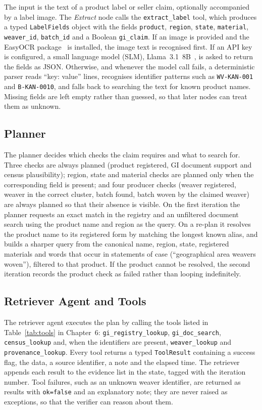 The input is the text of a product label or seller claim, optionally accompanied by a label image. The
\emph{Extract} node calls the \texttt{extract\_label} tool, which produces a typed \texttt{LabelFields}
object with the fields \texttt{product}, \texttt{region}, \texttt{state}, \texttt{material},
\texttt{weaver\_id}, \texttt{batch\_id} and a Boolean \texttt{gi\_claim}. If an image is provided and the
EasyOCR package~\cite{easyocr} is installed, the image text is recognised first. If an API key is
configured, a small language model (SLM), Llama~3.1~8B~\cite{llama3}, is asked to return the fields as
JSON. Otherwise, and whenever the model call fails, a deterministic parser reads ``key: value'' lines,
recognises identifier patterns such as \texttt{WV-KAN-001} and \texttt{B-KAN-0010}, and falls back to
searching the text for known product names. Missing fields are left empty rather than guessed, so that
later nodes can treat them as unknown.

\subsection{Planner}

The planner decides which checks the claim requires and what to search for. Three checks are always
planned (product registered, GI document support and census plausibility); region, state and material
checks are planned only when the corresponding field is present; and four producer checks (weaver
registered, weaver in the correct cluster, batch found, batch woven by the claimed weaver) are always
planned so that their absence is visible. On the first iteration the planner requests an exact match in
the registry and an unfiltered document search using the product name and region as the query. On a
re-plan it resolves the product name to its registered form by matching the longest known alias, and
builds a sharper query from the canonical name, region, state, registered materials and words that
occur in statements of case (``geographical area weavers woven''), filtered to that product. If the
product cannot be resolved, the second iteration records the product check as failed rather than
looping indefinitely.

\subsection{Retriever Agent and Tools}

The retriever agent executes the plan by calling the tools listed in Table~\ref{tab:tools} in
Chapter~6: \texttt{gi\_registry\_lookup}, \texttt{gi\_doc\_search}, \texttt{census\_lookup} and, when the
identifiers are present, \texttt{weaver\_lookup} and \texttt{provenance\_lookup}. Every tool returns a
typed \texttt{ToolResult} containing a success flag, the data, a source identifier, a note and the
elapsed time. The retriever appends each result to the evidence list in the state, tagged with the
iteration number. Tool failures, such as an unknown weaver identifier, are returned as results with
\texttt{ok=false} and an explanatory note; they are never raised as exceptions, so that the verifier can
reason about them.

